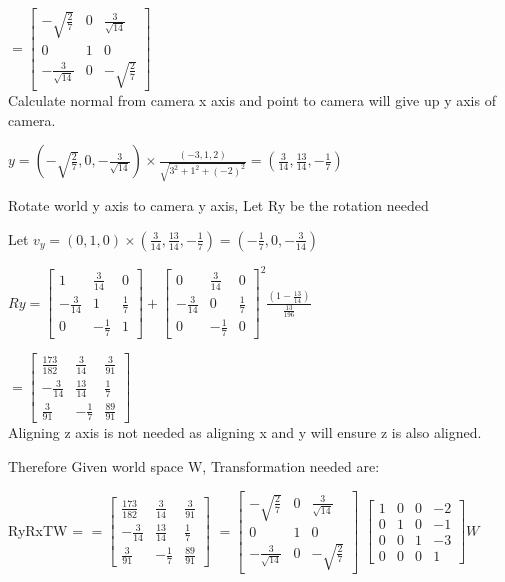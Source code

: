 \documentclass[12pt,a4paper]{article}
\begin{document}
$= \begin{bmatrix}
-\sqrt{\frac{2}{7}}&0&\frac{3}{\sqrt{14}}\\
0&1&0\\
-\frac{3}{\sqrt{14}}&0&-\sqrt{\frac{2}{7}}
\end{bmatrix}$
\\

Calculate normal from camera x axis and point to camera will give up y axis of camera.

$y = (- \sqrt{\frac{2}{7} }, 0, - \frac{3}{ \sqrt{14} }) \times \frac{(-3,1,2)}{\sqrt{3^2 + 1^2 + (-2)^2}} =  (\frac{3}{14}, \frac{13}{14},-\frac{1}{7})$

Rotate world y axis to camera y axis, Let Ry be the rotation needed

Let $v_y = (0,1,0) \times (\frac{3}{14}, \frac{13}{14},-\frac{1}{7}) = (-\frac{1}{7}, 0, -\frac{3}{14})$

$Ry = \begin{bmatrix}
1&\frac{3}{14}&0\\
-\frac{3}{14}&1&\frac{1}{7}\\
0&-\frac{1}{7}	&1
\end{bmatrix} +
\begin{bmatrix}
0&\frac{3}{14}&0\\
-\frac{3}{14}&0&\frac{1}{7}\\
0&-\frac{1}{7}	&0
\end{bmatrix}^2
\frac{(1-\frac{13}{14})}{\frac{13}{196}}$

$= \begin{bmatrix}
\frac{173}{182}& \frac{3}{14}& \frac{3}{91}\\
-\frac{3}{14}&\frac{13}{14}&\frac{1}{7}\\
\frac{3}{91}&-\frac{1}{7}& \frac{89}{91}
\end{bmatrix}$
\\

Aligning z axis is not needed as aligning x and y will ensure z is also aligned.

Therefore Given world space W, Transformation needed are:

RyRxTW =
$= \begin{bmatrix}
\frac{173}{182}& \frac{3}{14}& \frac{3}{91}\\
-\frac{3}{14}&\frac{13}{14}&\frac{1}{7}\\
\frac{3}{91}&-\frac{1}{7}& \frac{89}{91}
\end{bmatrix}$
$= \begin{bmatrix}
-\sqrt{\frac{2}{7}}&0&\frac{3}{\sqrt{14}}\\
0&1&0\\
-\frac{3}{\sqrt{14}}&0&-\sqrt{\frac{2}{7}}
\end{bmatrix}$
$\begin{bmatrix}
1&0&0&-2\\
0&1&0&-1\\
0&0&1&-3\\
0&0&0&1
\end{bmatrix}W
$
\end{document}
